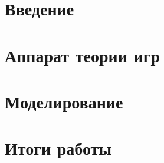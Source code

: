 \documentclass{mipt-thesis-bs}
\begin{document}
\tableofcontents
\chapter{Введение}

\chapter{Аппарат теории игр}

\chapter{Моделирование}

\chapter{Итоги работы}


\printbib
\end{document}
